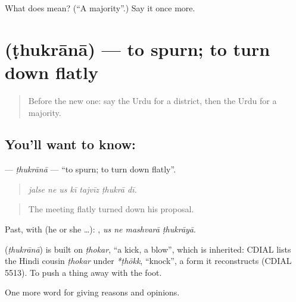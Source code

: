 \begin{tcolorbox}[breakable,colback=teal!4,colframe=teal!35!black,title={Before you move on}]
What does  mean? (\textquotedblleft{}A majority\textquotedblright{}.) Say it once more.
\end{tcolorbox}
\section[\texorpdfstring{\ur{ٹھکرانا} (ṭhukrānā)}{ٹھکرانا (ṭhukrānā)}]{ (ṭhukrānā) — to spurn; to turn down flatly}

\label{lesson:UR-C358-thukrana}



\begin{quote}
Before the new one: say the Urdu for a district, then the Urdu for a majority.
\end{quote}

\subsection*{You'll want to know: }
\textbf{} — \emph{ṭhukrānā} — \textquotedblleft{}to spurn; to turn down flatly\textquotedblright{}.

\begin{quote}
      
\end{quote}

\begin{quote}
\emph{jalse ne us kī tajvīz ṭhukrā dī.}
\end{quote}

\begin{quote}
The meeting flatly turned down his proposal.
\end{quote}

Past, with  (he or she …):    , \emph{us ne mashvarā ṭhukrāyā}.

\begin{cousinweb}
\textbf{} (\emph{ṭhukrānā}) is built on \emph{ṭhokar}, \textquotedblleft{}a kick, a blow\textquotedblright{}, which is inherited: CDIAL lists the Hindi cousin \emph{ṭhokar} under \emph{*ṭhōkk}, \textquotedblleft{}knock\textquotedblright{}, a form it reconstructs (CDIAL 5513). To push a thing away with the foot.
\end{cousinweb}

\begin{grammarlens}[title={What you've built}]
One more word for giving reasons and opinions.
\end{grammarlens}

